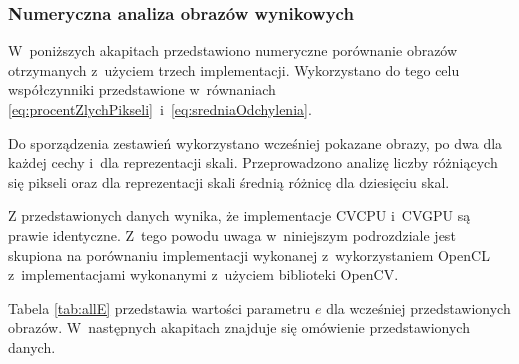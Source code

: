 \subsubsection{Numeryczna analiza obrazów wynikowych}
\label{subsec:porownanieNumerycznePoprawnosc}

W~poniższych akapitach przedstawiono numeryczne porównanie obrazów otrzymanych z~użyciem trzech implementacji. Wykorzystano do tego celu współczynniki przedstawione w~równaniach \eqref{eq:procentZlychPikseli}~i~\eqref{eq:sredniaOdchylenia}.

Do sporządzenia zestawień wykorzystano wcześniej pokazane obrazy, po dwa dla każdej cechy i~dla reprezentacji skali. Przeprowadzono analizę liczby różniących się pikseli oraz dla reprezentacji skali średnią różnicę dla dziesięciu skal. 

Z przedstawionych danych wynika, że implementacje CVCPU i~CVGPU są prawie identyczne. Z~tego powodu uwaga w~niniejszym podrozdziale jest skupiona na porównaniu implementacji wykonanej z~wykorzystaniem OpenCL z~implementacjami wykonanymi z~użyciem biblioteki OpenCV.

Tabela \ref{tab:allE} przedstawia wartości parametru $ e $ dla wcześniej przedstawionych obrazów. W~następnych akapitach znajduje się omówienie przedstawionych danych.

